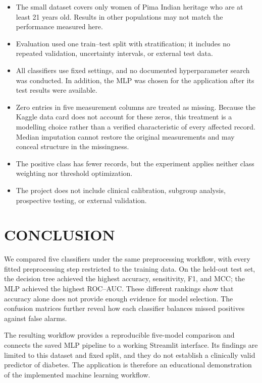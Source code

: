 \documentclass[pdflatex,sn-vancouver-num]{sn-jnl}
\begin{document}
\begin{itemize}
    \item The small dataset covers only women of Pima Indian heritage who are at least 21 years old. Results in other populations may not match the performance measured here.
    \item Evaluation used one train--test split with stratification; it includes no repeated validation, uncertainty intervals, or external test data.
    \item All classifiers use fixed settings, and no documented hyperparameter search was conducted. In addition, the MLP was chosen for the application after its test results were available.
    \item Zero entries in five measurement columns are treated as missing. Because the Kaggle data card does not account for these zeros, this treatment is a modelling choice rather than a verified characteristic of every affected record. Median imputation cannot restore the original measurements and may conceal structure in the missingness.
    \item The positive class has fewer records, but the experiment applies neither class weighting nor threshold optimization.
    \item The project does not include clinical calibration, subgroup analysis, prospective testing, or external validation.
\end{itemize}

\FloatBarrier
\section{CONCLUSION}\label{sec:conclusion}

We compared five classifiers under the same preprocessing workflow, with every fitted preprocessing step restricted to the training data. On the held-out test set, the decision tree achieved the highest accuracy, sensitivity, F1, and MCC; the MLP achieved the highest ROC--AUC. These different rankings show that accuracy alone does not provide enough evidence for model selection. The confusion matrices further reveal how each classifier balances missed positives against false alarms.

The resulting workflow provides a reproducible five-model comparison and connects the saved MLP pipeline to a working Streamlit interface. Its findings are limited to this dataset and fixed split, and they do not establish a clinically valid predictor of diabetes. The application is therefore an educational demonstration of the implemented machine learning workflow.

\backmatter

\clearpage
{}
{}

\end{document}
